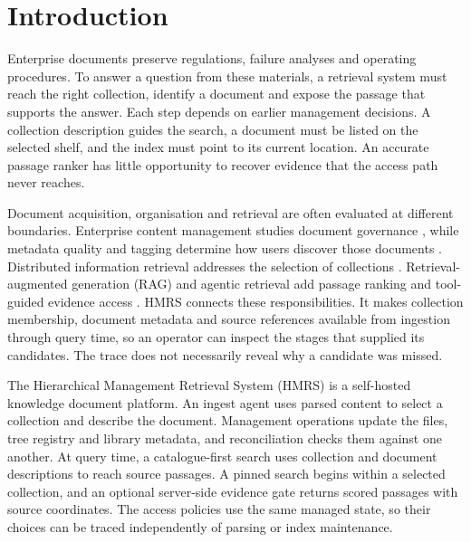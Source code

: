 \section{Introduction}
\label{sec:intro}

Enterprise documents preserve regulations, failure analyses and operating
procedures. To answer a question from these materials, a retrieval system
must reach the right collection, identify a document and expose the passage
that supports the answer. Each step depends on earlier management decisions.
A collection description guides the search, a document must be listed on
the selected shelf, and the index must point to its current location.
An accurate passage ranker has little opportunity to recover evidence that
the access path never reaches.

Document acquisition, organisation and retrieval are often evaluated at
different boundaries. Enterprise content management studies document
governance \cite{paivarinta-ecm-2005,tyrvaainen-ecm-2006}, while metadata
quality and tagging determine how users discover those documents
\cite{park-metadata-quality-2009,golder-tagging-2006}. Distributed
information retrieval addresses the selection of collections
\cite{callan1995searching,si2003redde}. Retrieval-augmented generation
(RAG) and agentic retrieval add passage ranking and tool-guided evidence
access \cite{rag-lewis,dpr,modular-rag,mcp}.
HMRS connects these responsibilities. It makes collection membership,
document metadata and source references available from ingestion through
query time, so an operator can inspect the stages that supplied its
candidates. The trace does not necessarily reveal why a candidate was missed.

The Hierarchical Management Retrieval System (HMRS) is a self-hosted
knowledge document platform. An ingest agent uses parsed content to select
a collection and describe the document. Management operations update the
files, tree registry and library metadata, and reconciliation checks them
against one another. At query time, a catalogue-first search uses collection
and document descriptions to reach source passages. A pinned search begins
within a selected collection, and an optional server-side evidence gate
returns scored passages with source coordinates. The access policies use the
same managed state, so their choices can be traced independently of parsing
or index maintenance.


